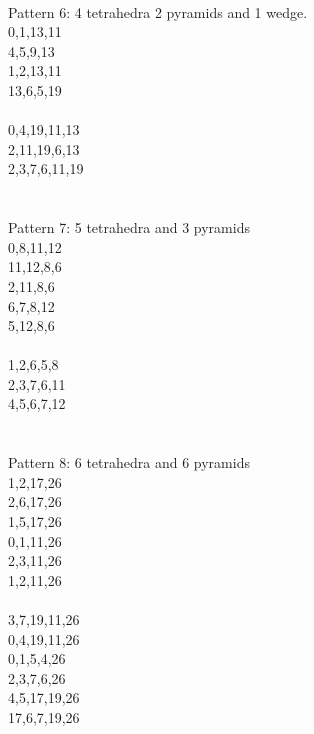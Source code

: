 \documentclass[twocolumn]{article}
\begin{document}
 \\
\tiny Pattern 6: 4 tetrahedra 2 pyramids and 1 wedge. \\
\tiny 0,1,13,11\\
\tiny 4,5,9,13 \\
\tiny 1,2,13,11 \\
\tiny 13,6,5,19 \\
\tiny    \\
\tiny 0,4,19,11,13 \\
\tiny 2,11,19,6,13 \\
\tiny 2,3,7,6,11,19 \\
\tiny    \\
 
 \\
\tiny Pattern 7: 5 tetrahedra and 3 pyramids \\
\tiny 0,8,11,12 \\
\tiny 11,12,8,6 \\
\tiny 2,11,8,6 \\
\tiny 6,7,8,12 \\
\tiny 5,12,8,6 \\
\tiny   \\
\tiny 1,2,6,5,8 \\
\tiny 2,3,7,6,11 \\
\tiny 4,5,6,7,12 \\
\tiny   \\




 \\ 
\tiny Pattern 8: 6 tetrahedra and 6 pyramids \\
        1,2,17,26 \\
        2,6,17,26 \\
        1,5,17,26 \\
        0,1,11,26 \\
        2,3,11,26 \\
        1,2,11,26 \\
 \\
        3,7,19,11,26 \\ 
        0,4,19,11,26 \\ 
        0,1,5,4,26 \\ 
        2,3,7,6,26 \\ 
        4,5,17,19,26 \\ 
        17,6,7,19,26 \\ 
        \\
        \\    
\end{document}
